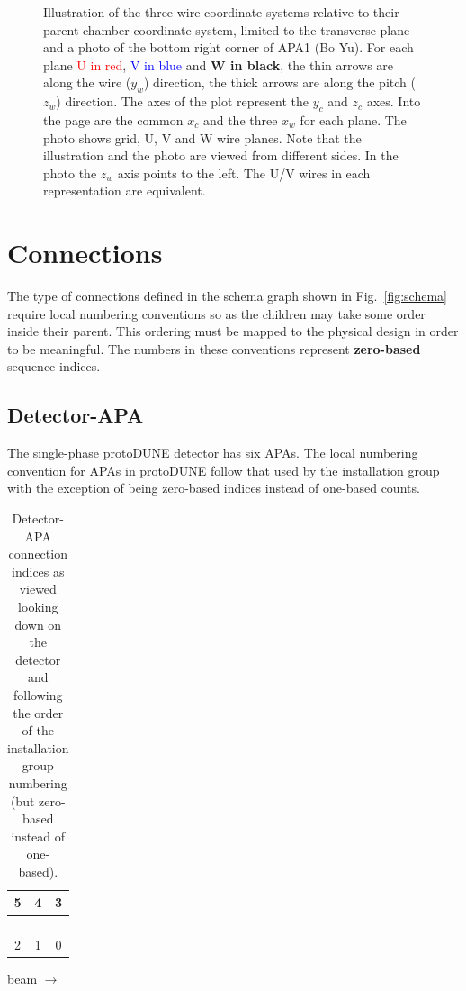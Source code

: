\documentclass[pdftex,12pt,letter]{article}
\begin{document}
\begin{figure}[htp]
  \caption{Illustration of the three wire coordinate systems relative
    to their parent chamber coordinate system, limited to the
    transverse plane and a photo of the bottom right corner of APA1
    (Bo Yu).  For each plane \textcolor{red}{U in red},
    \textcolor{blue}{V in blue} and \textbf{W in black}, the thin
    arrows are along the wire ($y_w$) direction, the thick arrows are
    along the pitch ($z_w$) direction. The axes of the plot represent
    the $y_c$ and $z_c$ axes.  Into the page are the common $x_c$ and
    the three $x_w$ for each plane.  The photo shows grid, U, V and W
    wire planes.  Note that the illustration and the photo are viewed
    from different sides.  In the photo the $z_w$ axis points to the
    left.  The U/V wires in each representation are equivalent.}
  \label{fig:coords}
\end{figure}

\section{Connections}

The type of connections defined in the schema graph shown in
Fig.~\ref{fig:schema} require local numbering conventions so as the
children may take some order inside their parent.  This ordering must
be mapped to the physical design in order to be meaningful.  The
numbers in these conventions represent \textbf{zero-based} sequence
indices.

\subsection{Detector-APA}

The single-phase protoDUNE detector has six APAs.  The local numbering
convention for APAs in protoDUNE follow that used by the installation
group with the exception of being zero-based indices instead of
one-based counts.


\begin{table}[htp]
  
  \centering
  \begin{tabular}[h]{|c|c|c|}
    \hline
    \hline
    \hline
    5 & 4 & 3\\
    \hline
      &&\\
      &&\\
    \hline
    \hline
    \hline
      &&\\
      &&\\
    \hline
    2 & 1 & 0\\
    \hline
    \hline
    \hline
  \end{tabular}

  beam $\longrightarrow$

  \caption{Detector-APA connection indices as viewed looking down on
    the detector and following the order of the installation group
    numbering (but zero-based instead of one-based).}
  \label{tab:tpc}

\end{table}
\end{document}
